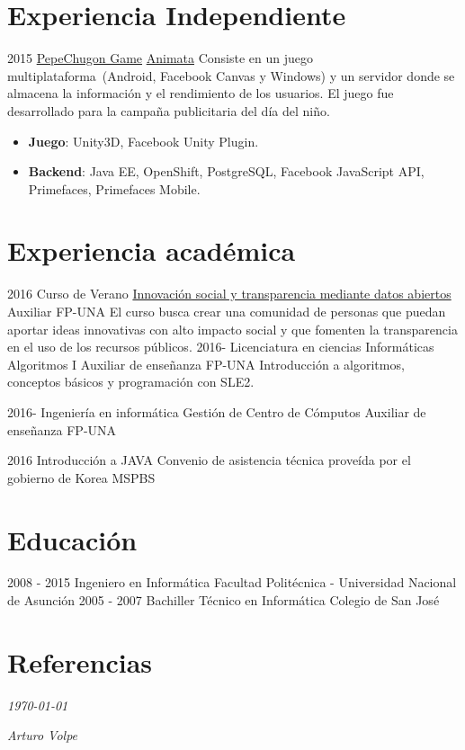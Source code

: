 \documentclass[]{friggeri-cv}
\begin{document}
\section{Experiencia Independiente}
\proyectof
    {2015}
    {\href{https://apps.facebook.com/pechugon_pepe}{PepeChugon Game}}
    {\href{http://www.animata.com.py/}{Animata}}
    {Consiste en un juego multiplataforma~(Android, Facebook Canvas y Windows)
        y un servidor donde se almacena la información y el rendimiento de los
        usuarios. El juego fue desarrollado para la campaña publicitaria del día
        del niño.}
    {\begin{itemize}
            \item \textbf{Juego}: Unity3D, Facebook Unity Plugin.
            \item \textbf{Backend}: Java EE, OpenShift, PostgreSQL, Facebook
                JavaScript API, Primefaces, Primefaces Mobile.
        \end{itemize}}

    \section{Experiencia académica}
\clase
    {2016}
    {Curso de Verano}
    {\href{http://www.pol.una.py/cursosverano/index.php?option=com_content&view=article&layout=edit&id=91}{Innovación
            social y transparencia mediante datos abiertos}} 
    {Auxiliar}
    {FP-UNA}
    {El curso busca crear una comunidad de personas que puedan aportar ideas
        innovativas con alto impacto social y que fomenten la transparencia en
        el uso de los recursos públicos. }
\clase
    {2016-}
    {Licenciatura en ciencias Informáticas}
    {Algoritmos I} 
    {Auxiliar de enseñanza}
    {FP-UNA}
    {Introducción a algoritmos, conceptos básicos y programación con SLE2.}

\clase
    {2016-}
    {Ingeniería en informática}
    {Gestión de Centro de Cómputos} 
    {Auxiliar de enseñanza}
    {FP-UNA}
    {}

\clase
    {2016}
    {}
    {Introducción a JAVA} 
    {Convenio de asistencia técnica proveída por el gobierno de Korea}
    {MSPBS}
    {}


\section{Educación}
\begin{entrylist}
  \entry
    {2008 - 2015}
    {Ingeniero en Informática}
    {Facultad Politécnica - Universidad Nacional de Asunción}
    {}
  \entry
    {2005 - 2007}
    {Bachiller Técnico en Informática}
    {Colegio de San José}
    {}
\end{entrylist}



\section{Referencias}
\begin{entrylist}
\end{entrylist}

\begin{flushleft}
    \emph{\today{}}
\end{flushleft}
\begin{flushright}
    \emph{Arturo Volpe}
\end{flushright}
\end{document}
